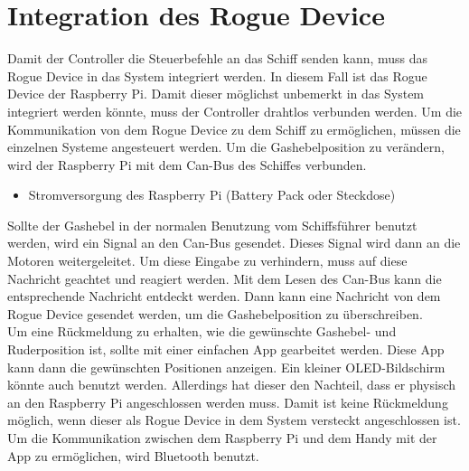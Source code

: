 \section{Integration des Rogue Device}
Damit der Controller die Steuerbefehle an das Schiff senden kann, muss das Rogue Device in das System integriert werden.
In diesem Fall ist das Rogue Device der Raspberry Pi. Damit dieser möglichst unbemerkt in das System integriert werden könnte,
muss der Controller drahtlos verbunden werden. Um die Kommunikation von dem Rogue Device zu dem Schiff zu ermöglichen, müssen
die einzelnen Systeme angesteuert werden. Um die Gashebelposition zu verändern, wird der Raspberry Pi mit dem Can-Bus des Schiffes
verbunden. 
\begin{itemize}
    \item Stromversorgung des Raspberry Pi (Battery Pack oder Steckdose)
\end{itemize}

Sollte der Gashebel in der normalen Benutzung vom Schiffsführer benutzt werden, wird ein Signal an den Can-Bus gesendet. Dieses Signal wird dann an die Motoren weitergeleitet.
Um diese Eingabe zu verhindern, muss auf diese Nachricht geachtet und reagiert werden. Mit dem Lesen des Can-Bus kann die 
entsprechende Nachricht entdeckt werden. Dann kann eine Nachricht von dem Rogue Device gesendet werden, um die Gashebelposition
zu überschreiben.
\\
Um eine Rückmeldung zu erhalten, wie die gewünschte Gashebel- und Ruderposition ist, sollte mit einer einfachen App
gearbeitet werden. Diese App kann dann die gewünschten Positionen anzeigen. Ein kleiner OLED-Bildschirm könnte auch benutzt 
werden. Allerdings hat dieser den Nachteil, dass er physisch an den Raspberry Pi angeschlossen werden muss. Damit 
ist keine Rückmeldung möglich, wenn dieser als Rogue Device in dem System versteckt angeschlossen ist.
Um die Kommunikation zwischen dem Raspberry Pi und dem Handy mit der App zu ermöglichen, wird Bluetooth benutzt.

